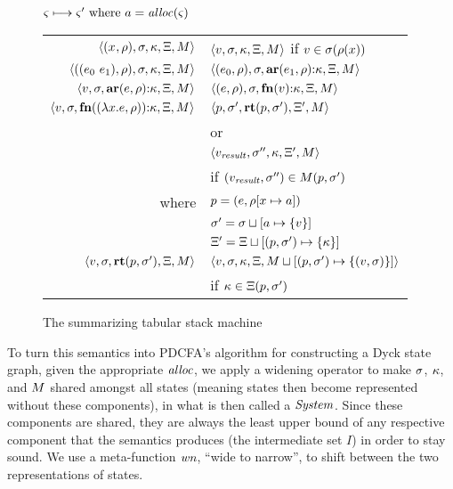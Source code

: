 \begin{figure}
  \centering
  $\varsigma \longmapsto \varsigma' \text{ where } a = \mathit{alloc}(\varsigma)$ \\
  \begin{tabular}{r|l}
    \hline
    $\langle (x^{{}}, \rho), \sigma, \kappa, \Xi, M \rangle$
    &
    $\langle v,\sigma,\kappa, \Xi, M \rangle$ if $v \in \sigma(\rho(x))$
    \\
    $\langle ((e_{0}\ e_{1}){}, \rho), \sigma, \kappa, \Xi, M \rangle$
    &
    $\langle (e_{0}, \rho), \sigma, \mathbf{ar}{}(e_{1},\rho){\tt :} \kappa, \Xi, M \rangle$
    \\
    $\langle v, \sigma, \mathbf{ar}{}(e,\rho){\tt :} \kappa, \Xi, M \rangle$
    &
    $\langle (e, \rho), \sigma, \mathbf{fn}{}(v){\tt :} \kappa, \Xi, M \rangle$
    \\
    $\langle v,\sigma,\mathbf{fn}{}((\lambda{} x. e, \rho)){\tt :} \kappa,\Xi,M \rangle$
    & %
    $\langle p,
          \sigma',
          \mathbf{rt}(p, \sigma'),
          \Xi',
          M \rangle$
\\
    & or \\
    & $\langle v_\mathit{result},
            \sigma'',
            \kappa,
            \Xi',
            M \rangle$
    \\ & \quad if $(v_\mathit{result},\sigma'') \in M(p,\sigma')$
    \\ %
    where & $p = (e, \rho[x \mapsto a])$ \\
          & $\sigma' = \sigma\sqcup[a \mapsto \{ v \}]$ \\
          & $\Xi' = \Xi\sqcup[(p, \sigma') \mapsto \{ \kappa \}]$
    \\
    $\langle v, \sigma, \mathbf{rt}(p,\sigma'), \Xi, M \rangle$
    &
    $\langle v, \sigma, \kappa, \Xi, M\sqcup[(p, \sigma') \mapsto \{ (v,\sigma) \}] \rangle$
    \\ & \quad if $\kappa \in \Xi(p, \sigma')$
  \end{tabular}
  \caption{The summarizing tabular stack machine}
  \label{fig:summary-semantics}
\end{figure}

To turn this semantics into PDCFA's algorithm for constructing a Dyck state graph, given the appropriate $\mathit{alloc}$, we apply a widening operator to make $\sigma$, $\kappa$, and $M$ shared amongst all states (meaning states then become represented without these components), in what is then called a $\mathit{System}$.
%
Since these components are shared, they are always the least upper bound of any respective component that the semantics produces (the intermediate set $I$) in order to stay sound.
%
We use a meta-function $\mathit{wn}$, ``wide to narrow'', to shift between the two representations of states.

